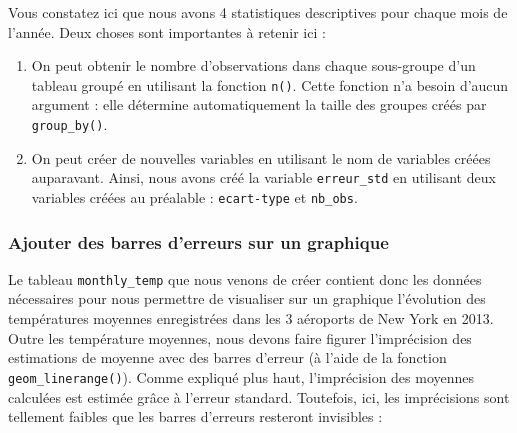 \documentclass[
  a4paper,
]{article}
\newenvironment{Shaded}{\begin{snugshade}}{\end{snugshade}}
\newcommand{\DataTypeTok}[1]{\textcolor[rgb]{0.00,0.34,0.68}{#1}}
\newcommand{\DecValTok}[1]{\textcolor[rgb]{0.69,0.50,0.00}{#1}}
\newcommand{\KeywordTok}[1]{\textcolor[rgb]{0.12,0.11,0.11}{\textbf{#1}}}
\newcommand{\NormalTok}[1]{\textcolor[rgb]{0.12,0.11,0.11}{#1}}
\newcommand{\OperatorTok}[1]{\textcolor[rgb]{0.12,0.11,0.11}{#1}}
\newcommand{\StringTok}[1]{\textcolor[rgb]{0.75,0.01,0.01}{#1}}
\providecommand{\tightlist}{%
  \setlength{\itemsep}{0pt}\setlength{\parskip}{0pt}}
\begin{document}
Vous constatez ici que nous avons 4 statistiques descriptives pour chaque mois de l'année. Deux choses sont importantes à retenir ici :

\begin{enumerate}
\def\labelenumi{\arabic{enumi}.}
\tightlist
\item
  On peut obtenir le nombre d'observations dans chaque sous-groupe d'un tableau groupé en utilisant la fonction \texttt{n()}. Cette fonction n'a besoin d'aucun argument : elle détermine automatiquement la taille des groupes créés par \texttt{group\_by()}.
\item
  On peut créer de nouvelles variables en utilisant le nom de variables créées auparavant. Ainsi, nous avons créé la variable \texttt{erreur\_std} en utilisant deux variables créées au préalable : \texttt{ecart-type} et \texttt{nb\_obs}.
\end{enumerate}

\hypertarget{ajouter-des-barres-derreurs-sur-un-graphique}{%
\subsubsection{Ajouter des barres d'erreurs sur un graphique}\label{ajouter-des-barres-derreurs-sur-un-graphique}}

Le tableau \texttt{monthly\_temp} que nous venons de créer contient donc les données nécessaires pour nous permettre de visualiser sur un graphique l'évolution des températures moyennes enregistrées dans les 3 aéroports de New York en 2013. Outre les température moyennes, nous devons faire figurer l'imprécision des estimations de moyenne avec des barres d'erreur (à l'aide de la fonction \texttt{geom\_linerange()}). Comme expliqué plus haut, l'imprécision des moyennes calculées est estimée grâce à l'erreur standard. Toutefois, ici, les imprécisions sont tellement faibles que les barres d'erreurs resteront invisibles :

\begin{Shaded}
\end{Shaded}
\end{document}
